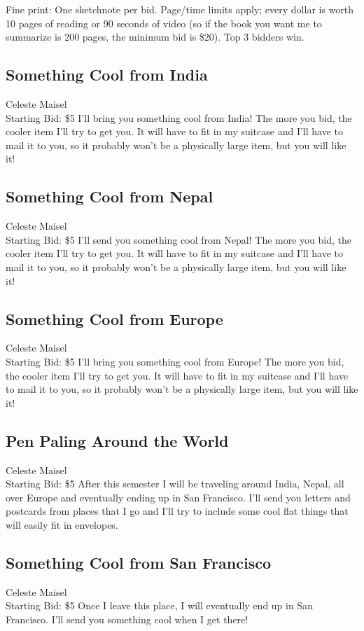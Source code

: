 \documentclass[11pt]{article}
\begin{document}
Fine print: One sketchnote per bid. Page/time limits apply; every dollar is worth 10 pages of reading or 90 seconds of video (so if the book you want me to summarize is 200 pages, the minimum bid is \$20). Top 3 bidders win.
\subsection{Something Cool from India}
Celeste Maisel
\\
Starting Bid: \$5
\newline
I'll bring you something cool from India!  The more you bid, the cooler item I'll try to get you.  It will have to fit in my suitcase and I'll have to mail it to you, so it probably won't be a physically large item, but you will like it!
\subsection{Something Cool from Nepal}
Celeste Maisel
\\
Starting Bid: \$5
\newline
I'll send you something cool from Nepal!  The more you bid, the cooler item I'll try to get you.  It will have to fit in my suitcase and I'll have to mail it to you, so it probably won't be a physically large item, but you will like it!
\subsection{Something Cool from Europe}
Celeste Maisel
\\
Starting Bid: \$5
\newline
I'll bring you something cool from Europe!  The more you bid, the cooler item I'll try to get you.  It will have to fit in my suitcase and I'll have to mail it to you, so it probably won't be a physically large item, but you will like it!
\subsection{Pen Paling Around the World}
Celeste Maisel
\\
Starting Bid: \$5
\newline
After this semester I will be traveling around India, Nepal, all over Europe and eventually ending up in San Francisco.  I'll send you letters and postcards from places that I go and I'll try to include some cool flat things that will easily fit in envelopes.
\subsection{Something Cool from San Francisco}
Celeste Maisel
\\
Starting Bid: \$5
\newline
Once I leave this place, I will eventually end up in San Francisco. I'll send you something cool when I get there!
\end{document}
